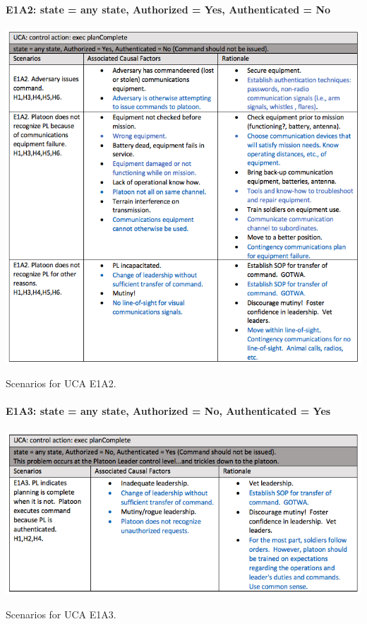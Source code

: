 \documentclass[../../main/main.tex]{subfiles}
\begin{document}
\paragraph*{E1A2: state  = any state, Authorized = Yes, Authenticated = No}
\begin{table}[ht!]
\begin{center}
\includegraphics[width=\linewidth]{../figures/ucae1a2}
\caption{Scenarios for UCA E1A2.}
\label{ucae1a2}
\end{center}
\end{table}
\clearpage

\paragraph*{E1A3: state  = any state, Authorized = No, Authenticated = Yes}

\begin{table}[ht!]
\begin{center}
\includegraphics[width=\linewidth]{../figures/ucae1a3}
\caption{Scenarios for UCA E1A3.}
\label{ucae1a3}
\end{center}
\end{table}
\clearpage
\end{document}
